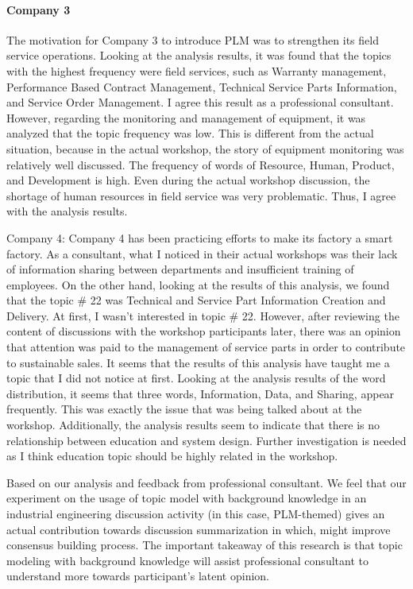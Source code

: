 \documentclass[senior]{IPSstyle}
\begin{document}
\paragraph{Company 3} The motivation for Company 3 to introduce PLM was to strengthen its field service operations. Looking at the analysis results, it was found that the topics with the highest frequency were field services, such as Warranty management, Performance Based Contract Management, Technical Service Parts Information, and Service Order Management. I agree this result as a professional consultant. However, regarding the monitoring and management of equipment, it was analyzed that the topic frequency was low. This is different from the actual situation, because in the actual workshop, the story of equipment monitoring was relatively well discussed. The frequency of words of Resource, Human, Product, and Development is high. Even during the actual workshop discussion, the shortage of human resources in field service was very problematic. Thus, I agree with the analysis results.

Company 4: Company 4 has been practicing efforts to make its factory a smart factory. As a consultant, what I noticed in their actual workshops was their lack of information sharing between departments and insufficient training of employees. On the other hand, looking at the results of this analysis, we found that the topic \# 22 was Technical and Service Part Information Creation and Delivery. At first, I wasn’t interested in topic \# 22. However, after reviewing the content of discussions with the workshop participants later, there was an opinion that attention was paid to the management of service parts in order to contribute to sustainable sales. It seems that the results of this analysis have taught me a topic that I did not notice at first. Looking at the analysis results of the word distribution, it seems that three words, Information, Data, and Sharing, appear frequently. This was exactly the issue that was being talked about at the workshop. Additionally, the analysis results seem to indicate that there is no relationship between education and system design. Further investigation is needed as I think education topic should be highly related in the workshop.

Based on our analysis and feedback from professional consultant. We feel that our experiment on the usage of topic model with background knowledge in an industrial engineering discussion activity (in this case, PLM-themed) gives an actual contribution towards discussion summarization in which, might improve consensus building process. The important takeaway of this research is that topic modeling with background knowledge will assist professional consultant to understand more towards participant’s latent opinion.
\end{document}
